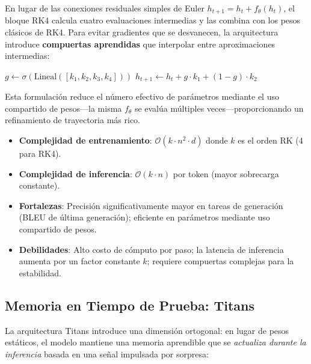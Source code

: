 En lugar de las conexiones residuales simples de Euler $h_{t+1} = h_t + f_\theta(h_t)$, el bloque RK4 calcula cuatro evaluaciones intermedias y las combina con los pesos clásicos de RK4. Para evitar gradientes que se desvanecen, la arquitectura introduce \textbf{compuertas aprendidas} que interpolar entre aproximaciones intermedias:

\begin{algorithmic}[1]
\State $g \gets \sigma(\text{Lineal}([k_1, k_2, k_3, k_4]))$ 
\State $h_{t+1} \gets h_t + g \cdot k_1 + (1-g) \cdot k_2$ 
\end{algorithmic}

Esta formulación reduce el número efectivo de parámetros mediante el uso compartido de pesos---la misma $f_\theta$ se evalúa múltiples veces---proporcionando un refinamiento de trayectoria más rico.

\begin{itemize}[leftmargin=*]
    \item \textbf{Complejidad de entrenamiento}: $\mathcal{O}(k \cdot n^2 \cdot d)$ donde $k$ es el orden RK (4 para RK4).
    \item \textbf{Complejidad de inferencia}: $\mathcal{O}(k \cdot n)$ por token (mayor sobrecarga constante).
    \item \textbf{Fortalezas}: Precisión significativamente mayor en tareas de generación (BLEU de última generación); eficiente en parámetros mediante uso compartido de pesos.
    \item \textbf{Debilidades}: Alto costo de cómputo por paso; la latencia de inferencia aumenta por un factor constante $k$; requiere compuertas complejas para la estabilidad.
\end{itemize}

\subsection{Memoria en Tiempo de Prueba: Titans}

La arquitectura Titans \citep{behrouz_titans_2025} introduce una dimensión ortogonal: en lugar de pesos estáticos, el modelo mantiene una memoria aprendible que se \textit{actualiza durante la inferencia} basada en una señal impulsada por sorpresa:

